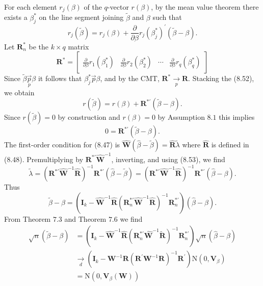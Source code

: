 \documentclass[10pt]{article}
\begin{document}
For each element $r_{j}(\beta)$ of the $q$-vector $r(\beta)$, by the mean value theorem there exists a $\beta_{j}^{*}$ on the line segment joining $\widetilde{\beta}$ and $\beta$ such that
$$
r_{j}(\widetilde{\beta})=r_{j}(\beta)+\frac{\partial}{\partial \beta} r_{j}\left(\beta_{j}^{*}\right)^{\prime}(\widetilde{\beta}-\beta) .
$$
Let $\boldsymbol{R}_{n}^{*}$ be the $k \times q$ matrix
$$
\boldsymbol{R}^{*}=\left[\begin{array}{llll}
\frac{\partial}{\partial \beta} r_{1}\left(\beta_{1}^{*}\right) & \frac{\partial}{\partial \beta} r_{2}\left(\beta_{2}^{*}\right) & \cdots & \frac{\partial}{\partial \beta} r_{q}\left(\beta_{q}^{*}\right)
\end{array}\right]
$$
Since $\widetilde{\beta} \underset{p}{\vec{p}} \beta$ it follows that $\beta_{j}^{*} \vec{p} \beta$, and by the CMT, $\boldsymbol{R}^{*} \underset{p}{\rightarrow} \boldsymbol{R}$. Stacking the (8.52), we obtain
$$
r(\widetilde{\beta})=r(\beta)+\boldsymbol{R}^{* \prime}(\widetilde{\beta}-\beta) .
$$
Since $r(\widetilde{\beta})=0$ by construction and $r(\beta)=0$ by Assumption $8.1$ this implies
$$
0=\boldsymbol{R}^{* \prime}(\widetilde{\beta}-\beta) .
$$
The first-order condition for (8.47) is $\widehat{\boldsymbol{W}}(\widehat{\beta}-\widetilde{\beta})=\widehat{\boldsymbol{R}} \widetilde{\lambda}$ where $\widehat{\boldsymbol{R}}$ is defined in (8.48). Premultiplying by $\boldsymbol{R}^{* \prime} \widehat{\boldsymbol{W}}^{-1}$, inverting, and using (8.53), we find
$$
\tilde{\lambda}=\left(\boldsymbol{R}^{* \prime} \widehat{\boldsymbol{W}}^{-1} \widehat{\boldsymbol{R}}\right)^{-1} \boldsymbol{R}^{* \prime}(\widehat{\beta}-\widetilde{\beta})=\left(\boldsymbol{R}^{* \prime} \widehat{\boldsymbol{W}}^{-1} \widehat{\boldsymbol{R}}\right)^{-1} \boldsymbol{R}^{* \prime}(\widehat{\beta}-\beta) .
$$
Thus
$$
\widetilde{\beta}-\beta=\left(\boldsymbol{I}_{k}-\widehat{\boldsymbol{W}}^{-1} \widehat{\boldsymbol{R}}\left(\boldsymbol{R}_{n}^{* \prime} \widehat{\boldsymbol{W}}^{-1} \widehat{\boldsymbol{R}}\right)^{-1} \boldsymbol{R}_{n}^{* \prime}\right)(\widehat{\beta}-\beta) .
$$
From Theorem $7.3$ and Theorem $7.6$ we find
$$
\begin{aligned}
\sqrt{n}(\widetilde{\beta}-\beta) &=\left(\boldsymbol{I}_{k}-\widehat{\boldsymbol{W}}^{-1} \widehat{\boldsymbol{R}}\left(\boldsymbol{R}_{n}^{* \prime} \widehat{\boldsymbol{W}}^{-1} \widetilde{\boldsymbol{R}}\right)^{-1} \boldsymbol{R}_{n}^{* \prime}\right) \sqrt{n}(\widehat{\beta}-\beta) \\
& \underset{d}{\longrightarrow}\left(\boldsymbol{I}_{k}-\boldsymbol{W}^{-1} \boldsymbol{R}\left(\boldsymbol{R}^{\prime} \boldsymbol{W}^{-1} \boldsymbol{R}\right)^{-1} \boldsymbol{R}^{\prime}\right) \mathrm{N}\left(0, \boldsymbol{V}_{\beta}\right) \\
&=\mathrm{N}\left(0, \boldsymbol{V}_{\beta}(\boldsymbol{W})\right)
\end{aligned}
$$
\end{document}
